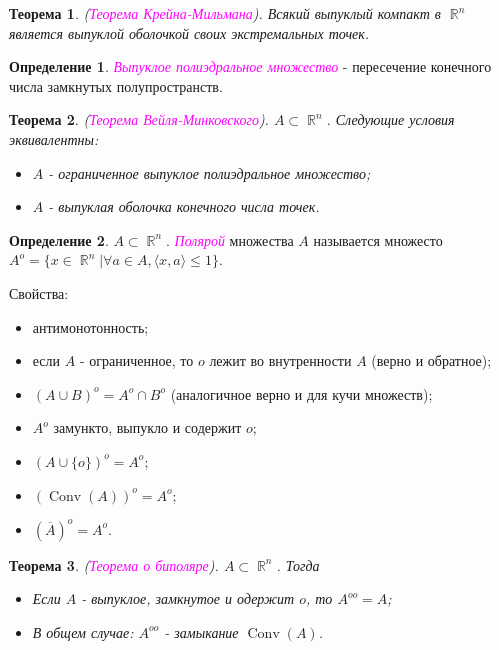 \documentclass[a4paper,100pt]{article}
\theoremstyle{indented}
\newtheorem{theorem}{Теорема}
\theoremstyle{definition}
\newtheorem{defn}{Определение}
\theoremstyle{remark}
\DeclareMathOperator{\Conv}{Conv}
\DeclareMathOperator{\RR}{\mathbb{R}}
\begin{document}
\begin{theorem}
    (\textit{\textcolor{magenta}{\hypertarget{s102}{Теорема Крейна-Мильмана}}}). Всякий выпуклый компакт в $\RR^n$ является выпуклой оболочкой своих экстремальных точек. 
\end{theorem}



\begin{defn}
    \textit{\textcolor{magenta}{\hypertarget{s103}{Выпуклое полиэдральное множество}}} - пересечение конечного числа замкнутых полупространств.
\end{defn}

\begin{theorem}
    (\textit{\textcolor{magenta}{\hypertarget{s104}{Теорема Вейля-Минковского}}}). $A \subset \RR^n$. Следующие условия эквивалентны:

    \begin{itemize}
        \item $A$ - ограниченное выпуклое полиэдральное множество; 
        \item $A$ - выпуклая оболочка конечного числа точек.
    \end{itemize}
\end{theorem}

\begin{defn}
    $A \subset \RR^n$. \textit{\textcolor{magenta}{\hypertarget{s105}{Полярой}}} множества $A$ называется множесто $A^o = \{x \in \RR^n | \forall a \in A, \langle x, a \rangle \leq 1\}$. 
\end{defn}

Свойства:

\begin{itemize}
    \item антимонотонность; 
    \item если $A$ - ограниченное, то $o$ лежит во внутренности $A$ (верно и обратное); 
    \item $(A \cup B)^o = A^o \cap B^o$ (аналогичное верно и для кучи множеств); 
    \item $A^o$ замункто, выпукло и содержит $o$; 
    \item $(A \cup \{o\})^o = A^o$; 
    \item $(\Conv(A))^o = A^o$; 
    \item $(\overline{A})^o = A^o$. 
\end{itemize}

\begin{theorem}
    (\textit{\textcolor{magenta}{\hypertarget{s106}{Теорема о биполяре}}}). $A \subset \RR^n$. Тогда 

    \begin{itemize}
        \item Если $A$ - выпуклое, замкнутое и одержит $o$, то $A^{oo}=A$; 
        \item В общем случае: $A^{oo}$ - замыкание $\Conv(A)$. 
    \end{itemize}
\end{theorem}
\end{document}
